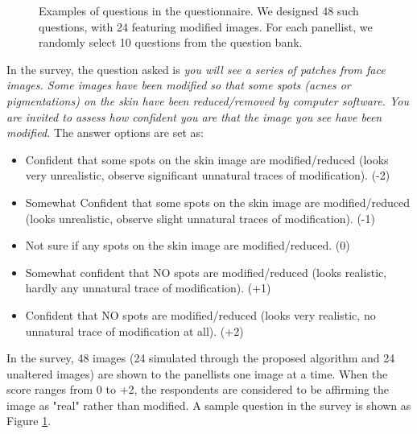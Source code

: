 \begin{spacing}{1.5}
\begin{figure}[t!]
    \caption{Examples of questions in the questionnaire. We designed 48 such questions, with 24 featuring modified images. For each panellist, we randomly select 10 questions from the question bank.}
    \label{fig:sample_form}
\end{figure}
In the survey, the question asked is \textit{you will see a series of patches from face images. Some images have been modified so that some spots (acnes or pigmentations) on the skin have been reduced/removed by computer software. You are invited to assess how confident you are that the image you see have been modified.} The answer options are set as:
\begin{itemize}
    \item Confident that some spots on the skin image are modified/reduced (looks very unrealistic, observe significant unnatural traces of modification). (-2)
    \item Somewhat Confident that some spots on the skin image are modified/reduced (looks unrealistic, observe slight unnatural traces of modification). (-1)
    \item Not sure if any spots on the skin image are modified/reduced. (0)
    \item Somewhat confident that NO spots are modified/reduced (looks realistic, hardly any unnatural trace of modification). (+1)
    \item Confident that NO spots are modified/reduced (looks very realistic, no unnatural trace of modification at all). (+2)
\end{itemize}

In the survey, 48 images (24 simulated through the proposed algorithm and 24 unaltered images) are shown to the panellists one image at a time. When the score ranges from 0 to +2, the respondents are considered to be affirming the image as "real" rather than modified. A sample question in the survey is shown as Figure \ref{fig:sample_form}.
\end{spacing}
\newpage
